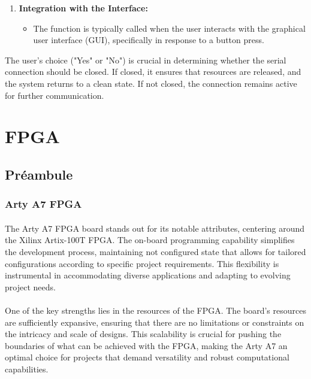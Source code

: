 \documentclass{article}
\begin{document}
\begin{enumerate}
    \item \textbf{Integration with the Interface:}
    \begin{itemize}
        \item The function is typically called when the user interacts with the graphical user interface (GUI), specifically in response to a button press.
    \end{itemize}
\end{enumerate}

The user's choice ("Yes" or "No") is crucial in determining whether the serial connection should be closed. If closed, it ensures that resources are released, and the system returns to a clean state. If not closed, the connection remains active for further communication.

















\newpage
\section{FPGA}
\subsection{Préambule}
\subsubsection{Arty A7 FPGA}

\paragraph{}The Arty A7 FPGA board stands out for its notable attributes, centering around the Xilinx Artix-100T FPGA. The on-board programming capability simplifies the development process, maintaining not configured state that allows for tailored configurations according to specific project requirements. This flexibility is instrumental in accommodating diverse applications and adapting to evolving project needs.

\paragraph{}One of the key strengths lies in the resources of the FPGA. The board's resources are sufficiently expansive, ensuring that there are no limitations or constraints on the intricacy and scale of designs. This scalability is crucial for pushing the boundaries of what can be achieved with the FPGA, making the Arty A7 an optimal choice for projects that demand versatility and robust computational capabilities.
\end{document}
